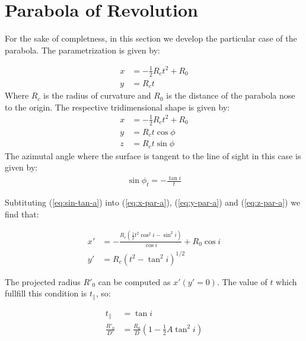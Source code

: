 \appendix
\appendixpage
\addappheadtotoc
\section{Parabola of Revolution}
\label{app:parabola}

For the sake of completness, in this section we develop the particular case of the parabola.
The parametrization is given by:

\begin{align}
x &= - \frac{1}{2}R_ct^2 + R_0 \\
y &= R_c t
\end{align}
Where $R_c$ is the radius of curvature and $R_0$ is the distance of the parabola nose to the
origin.
The respective tridimensional shape is given by:
\begin{align}
x &= -\frac{1}{2}R_ct^2 + R_0 \label{eq:x-par-a}\\
y &= R_c t \cos\phi  \label{eq:y-par-a}\\
z &= R_c t \sin\phi  \label{eq:z-par-a}
\end{align}
The azimutal angle where the surface is tangent to the line of sight in this case is given by:
\begin{align}
\sin\phi_t = -\frac{\tan i}{t} \label{eq:sin-tan-a} 
\end{align}

Subtituting (\ref{eq:sin-tan-a}) into (\ref{eq:x-par-a}), (\ref{eq:y-par-a}) and (\ref{eq:z-par-a}) we find that:

\begin{align}
x' &= -\frac{R_c(\frac{1}{2}t^2 \cos^2 i -\sin^2 i)}{\cos i}+R_0\cos i \\
y' &= R_c\left(t^2-\tan^2 i\right)^{1/2} 
\end{align}

The projected radius $R'_0$ can be computed as $x'(y'=0)$. The value of $t$ which fullfill this condition is $t_\parallel$, so:

\begin{align}
t_\parallel &= \tan i \\
\frac{R'_0}{D'} &= \frac{R_0}{D}\left(1-\frac{1}{2}A\tan^2 i\right)  
\end{align}


